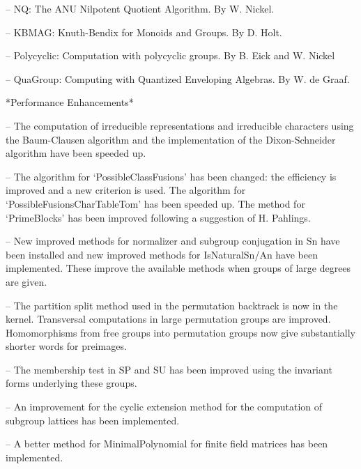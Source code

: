 \item{--}
   NQ: The ANU Nilpotent Quotient Algorithm.
    By W. Nickel.

\item{--}
   KBMAG: Knuth-Bendix for Monoids and Groups.
    By D. Holt.

\item{--}
   Polycyclic: Computation with polycyclic groups.
    By B. Eick and W. Nickel

\item{--}
   QuaGroup: Computing with Quantized Enveloping Algebras.
    By W. de Graaf.
\endlist

*Performance Enhancements*

\beginlist%
\item{--}
    The computation of irreducible representations and irreducible
    characters using the Baum-Clausen algorithm and the implementation of
    the Dixon-Schneider algorithm have been speeded up.
    
\item{--}
    The algorithm for
    `PossibleClassFusions' has been changed: the efficiency is improved and
    a new criterion is used. The algorithm for `PossibleFusionsCharTableTom'
    has been speeded up. The method for `PrimeBlocks' has been improved
    following a suggestion of H. Pahlings.

\item{--}
    New improved methods for normalizer and subgroup conjugation in Sn have
    been installed and new improved methods for IsNaturalSn/An have been
    implemented. These improve the available methods when groups of large
    degrees are given.

\item{--}
    The partition split method used in the permutation backtrack is now
    in the kernel. Transversal computations in large permutation groups
    are improved. Homomorphisms from free groups into permutation groups
    now give substantially shorter words for preimages.

\item{--}
    The membership test in SP and SU has been improved using the invariant
    forms underlying these groups.

\item{--}
    An improvement for the cyclic extension method for the computation of
    subgroup lattices has been implemented.

\item{--}
    A better method for MinimalPolynomial for finite field matrices has been
    implemented.

